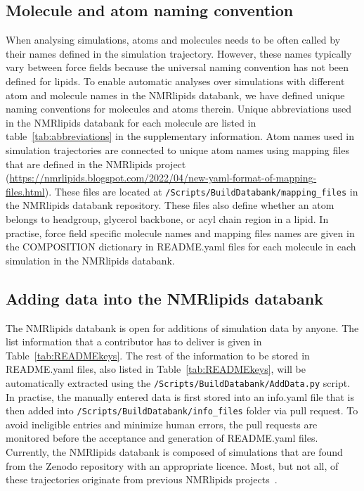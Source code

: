 \documentclass[fleqn,10pt]{wlscirep}
\begin{document}
\subsection{Molecule and atom naming convention} \label{naming}
When analysing simulations, atoms and molecules needs to be often called by their names defined in the simulation trajectory. However, these names typically vary between force fields because the universal naming convention has not been defined for lipids. To enable automatic analyses over simulations with different atom and molecule names in the NMRlipids databank, we have defined unique naming conventions for molecules and atoms therein. Unique abbreviations used in the NMRlipids databank for each molecule are listed in table~\ref{tab:abbreviations} in the supplementary information. Atom names used in simulation trajectories are connected to unique atom names using mapping files that are defined in the NMRlipids project (\url{https://nmrlipids.blogspot.com/2022/04/new-yaml-format-of-mapping-files.html}). These files are located at \texttt{/Scripts/BuildDatabank/mapping\_files} in the NMRlipids databank repository. These files also define whether an atom belongs to headgroup, glycerol backbone, or acyl chain region in a lipid. In practise, force field specific molecule names and mapping files
names are given in the COMPOSITION dictionary in README.yaml files for each molecule in each simulation in the NMRlipids databank.

\subsection{Adding data into the NMRlipids databank}
The NMRlipids databank is open for additions of simulation data by anyone. The list information that a contributor has to deliver is given in Table~\ref{tab:READMEkeys}. The rest of the information to be stored in README.yaml files, also listed in Table~\ref{tab:READMEkeys}, will be automatically extracted using the \texttt{/Scripts/BuildDatabank/AddData.py} script. In practise, the manually entered data is first stored into an info.yaml file that is then added into \texttt{/Scripts/BuildDatabank/info\_files} folder via pull request. To avoid ineligible entries and minimize human errors, the pull requests are monitored before the acceptance and generation of README.yaml files.  Currently, the NMRlipids databank is composed of simulations that are found from the Zenodo repository with an appropriate licence. Most, but not all, of these trajectories originate from previous NMRlipids projects~\cite{botan15,catte16,antila19,bacle21}.
\end{document}
